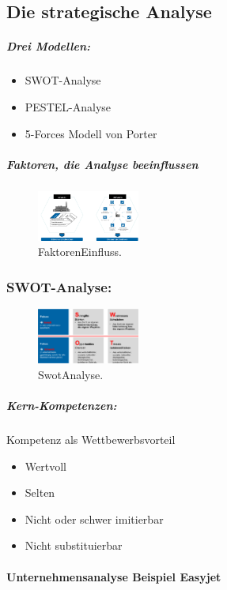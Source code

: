 \documentclass{article}
\begin{document}
\subsection{Die strategische Analyse}
\subparagraph{Drei Modellen:}
\begin{itemize}
\item SWOT-Analyse
\item PESTEL-Analyse
\item 5-Forces Modell von Porter
\end{itemize}

\subparagraph{Faktoren, die Analyse beeinflussen\\}
\begin{figure}[H]
\centering
\includegraphics[width=0.3\textwidth]{Resources/Image/FaktorenEinfluss.png}
\caption{\label{fig:FaktorenEinfluss}FaktorenEinfluss.}
\end{figure}

\subsubsection{SWOT-Analyse:}
\begin{figure}[H]
\centering
\includegraphics[width=0.3\textwidth]{Resources/Image/SwotAnalyse.png}
\caption{\label{fig:SwotAnalyse}SwotAnalyse.}
\end{figure}

\subparagraph{Kern-Kompetenzen:}

Kompetenz als Wettbewerbsvorteil
\begin{itemize}
\item Wertvoll
\item Selten
\item Nicht oder schwer imitierbar
\item Nicht substituierbar
\end{itemize}


\paragraph{Unternehmensanalyse Beispiel Easyjet \\ \\}
\end{document}
